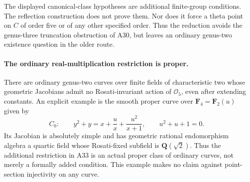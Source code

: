 \documentclass[11pt,a4paper]{article}
\begin{document}
The displayed canonical-class hypotheses are additional finite-group
conditions.  The reflection construction does not prove them.  Nor
does it force a theta point on $C$ of order five or of any other
specified order.  Thus the reduction avoids the genus-three
truncation obstruction of A30, but leaves an ordinary genus-two
existence question in the older route.


\paragraph{The ordinary real-multiplication restriction is proper.}
There are ordinary genus-two curves over finite fields of characteristic
two whose geometric Jacobians admit no Rosati-invariant action of
$\mathcal O_5$, even after extending constants. An explicit example is
the smooth proper curve over $\mathbf F_4=\mathbf F_2(u)$ given by
\[
 C_0:\qquad y^2+y=x+\frac{u}{x}+\frac{u^2}{x+1},
                         \qquad u^2+u+1=0.
 \tag{DRP.1}
\]
Its Jacobian is absolutely simple and has geometric rational
endomorphism algebra a quartic field whose Rosati-fixed subfield is
$\mathbf Q(\sqrt2)$. Thus the additional restriction in A33 is an
actual proper class of ordinary curves, not merely a formally added
condition. This example makes no claim against point-section
injectivity on any curve.
\end{document}
